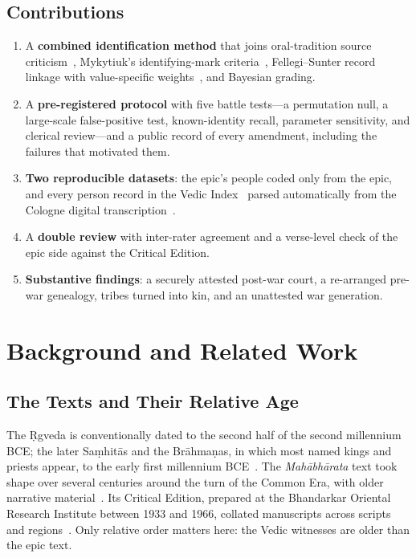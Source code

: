 \documentclass[journal]{IEEEtran}
\newcommand{\MBh}{\textit{Mahābhārata}}
\begin{document}
\subsection{Contributions}
\begin{enumerate}
\item A \textbf{combined identification method} that joins oral-tradition source criticism~\cite{vansina1985,henige1974},
Mykytiuk's identifying-mark criteria~\cite{mykytiuk2004,mykytiuk2009}, Fellegi--Sunter record linkage with
value-specific weights~\cite{fellegi1969,newcombe1959,christen2012,binette2022}, and Bayesian grading.
\item A \textbf{pre-registered protocol} with five battle tests---a permutation null, a large-scale false-positive test,
known-identity recall, parameter sensitivity, and clerical review---and a public record of every amendment, including
the failures that motivated them.
\item \textbf{Two reproducible datasets}: the epic's people coded only from the epic, and every person record in the Vedic
Index~\cite{macdonell1912} parsed automatically from the Cologne digital transcription~\cite{cdsl}.
\item A \textbf{double review} with inter-rater agreement and a verse-level check of the epic side against the
Critical Edition.
\item \textbf{Substantive findings}: a securely attested post-war court, a re-arranged pre-war genealogy, tribes turned
into kin, and an unattested war generation.
\end{enumerate}

\section{Background and Related Work}

\subsection{The Texts and Their Relative Age}
The Ṛgveda is conventionally dated to the second half of the second millennium BCE; the later Saṃhitās and the
Brāhmaṇas, in which most named kings and priests appear, to the early first millennium BCE~\cite{witzel1995}.
The \MBh{} text took shape over several centuries around the turn of the Common Era, with older narrative
material~\cite{brockington1998,hiltebeitel2001}. Its Critical Edition, prepared at the Bhandarkar Oriental Research
Institute between 1933 and 1966, collated manuscripts across scripts and regions~\cite{bori1966}. Only relative order
matters here: the Vedic witnesses are older than the epic text.
\end{document}
